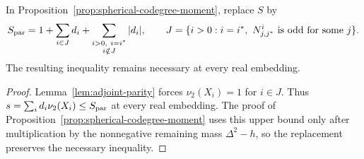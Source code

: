 \begin{corollary}
\label{cor:parity-spherical-bound}
In Proposition~\ref{prop:spherical-codegree-moment}, replace $S$ by
\[
 S_{\rm par}=1+\sum_{i\in J}d_i+
 \sum_{\substack{i>0,\ i=i^*\\i\notin J}}|d_i|,
 \qquad
 J=\{i>0:i=i^*,\ N_{j,j^*}^{i}\text{ is odd for some }j\}.
\]
The resulting inequality remains necessary at every real embedding.
\end{corollary}
\begin{proof}
Lemma~\ref{lem:adjoint-parity} forces $\nu_2(X_i)=1$ for $i\in J$.
Thus $s=\sum_i d_i\nu_2(X_i)\leq S_{\rm par}$ at every real
embedding. The proof of Proposition~\ref{prop:spherical-codegree-moment}
uses this upper bound only after multiplication by the nonnegative
remaining mass $\Delta^2-h$, so the replacement preserves the
necessary inequality.
\end{proof}

